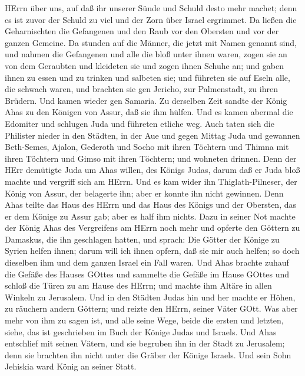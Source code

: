 HErrn über uns, auf daß ihr unserer Sünde und Schuld desto mehr machet;
denn es ist zuvor der Schuld zu viel und der Zorn über Israel ergrimmet.
 Da ließen die Geharnischten die Gefangenen und den Raub
vor den Obersten und vor der ganzen Gemeine.  Da stunden
auf die Männer, die jetzt mit Namen genannt sind, und nahmen die
Gefangenen und alle die bloß unter ihnen waren, zogen sie an von dem
Geraubten und kleideten sie und zogen ihnen Schuhe an; und gaben ihnen
zu essen und zu trinken und salbeten sie; und führeten sie auf Eseln
alle, die schwach waren, und brachten sie gen Jericho, zur Palmenstadt,
zu ihren Brüdern. Und kamen wieder gen Samaria.  Zu
derselben Zeit sandte der König Ahas zu den Königen von Assur, daß sie
ihm hülfen.  Und es kamen abermal die Edomiter und schlugen
Juda und führeten etliche weg.  Auch taten sich die
Philister nieder in den Städten, in der Aue und gegen Mittag Juda und
gewannen Beth-Semes, Ajalon, Gederoth und Socho mit ihren Töchtern und
Thimna mit ihren Töchtern und Gimso mit ihren Töchtern; und wohneten
drinnen.  Denn der HErr demütigte Juda um Ahas willen, des
Königs Judas, darum daß er Juda bloß machte und vergriff sich am HErrn.
 Und es kam wider ihn Thiglath-Pilneser, der König von
Assur, der belagerte ihn; aber er konnte ihn nicht gewinnen.
 Denn Ahas teilte das Haus des HErrn und das Haus des
Königs und der Obersten, das er dem Könige zu Assur gab; aber es half
ihm nichts.  Dazu in seiner Not machte der König Ahas des
Vergreifens am HErrn noch mehr  und opferte den Göttern zu
Damaskus, die ihn geschlagen hatten, und sprach: Die Götter der Könige
zu Syrien helfen ihnen; darum will ich ihnen opfern, daß sie mir auch
helfen; so doch dieselben ihm und dem ganzen Israel ein Fall waren.
 Und Ahas brachte zuhauf die Gefäße des Hauses GOttes und
sammelte die Gefäße im Hause GOttes und schloß die Türen zu am Hause des
HErrn; und machte ihm Altäre in allen Winkeln zu Jerusalem.
 Und in den Städten Judas hin und her machte er Höhen, zu
räuchern andern Göttern; und reizte den HErrn, seiner Väter GOtt.
 Was aber mehr von ihm zu sagen ist, und alle seine Wege,
beide die ersten und letzten, siehe, das ist geschrieben im Buch der
Könige Judas und Israels.  Und Ahas entschlief mit seinen
Vätern, und sie begruben ihn in der Stadt zu Jerusalem; denn sie
brachten ihn nicht unter die Gräber der Könige Israels. Und sein Sohn
Jehiskia ward König an seiner Statt.

